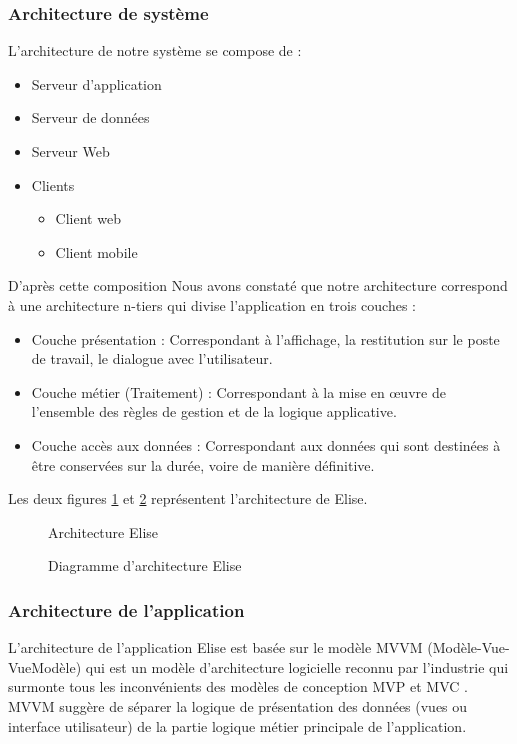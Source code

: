 \subsubsection{Architecture de système}
L'architecture de notre système se compose de :
\begin{itemize}
  \item Serveur d'application  
  \item Serveur de données  
  \item Serveur Web 
  \item Clients \begin{itemize}
    \item Client web  
    \item Client mobile 
  \end{itemize}
\end{itemize}

D'après cette composition Nous avons constaté que notre architecture correspond à une architecture n-tiers qui divise l'application en trois couches : 

\begin{itemize}
  \item Couche présentation : Correspondant à l'affichage, la restitution sur le poste de travail, le dialogue avec l'utilisateur. 
  \item Couche métier (Traitement) : Correspondant à la mise en œuvre de l'ensemble des règles de gestion et de la logique applicative. 
  \item Couche accès aux données : Correspondant aux données qui sont destinées à être conservées sur la durée, voire de manière définitive. 
\end{itemize}

Les deux figures \ref{fig:architecture_elise} et \ref{fig:digramme_architecture} représentent l'architecture de Elise.\\
\begin{figure}[H]
  \centering
  \caption{Architecture Elise}
  \label{fig:architecture_elise}
\end{figure}

\begin{figure}[H]
  \centering
  \caption{Diagramme d'architecture Elise}
  \label{fig:digramme_architecture}
\end{figure}

\subsubsection{Architecture de l'application}
L'architecture de l'application Elise est basée sur le modèle MVVM (Modèle-Vue-VueModèle) qui est un modèle d'architecture logicielle reconnu par l'industrie qui surmonte tous les inconvénients des modèles de conception MVP et MVC . MVVM suggère de séparer la logique de
présentation des données (vues ou interface utilisateur) de la partie logique métier principale de l'application.

